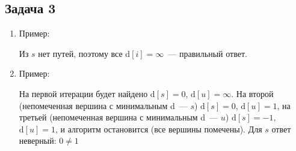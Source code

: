 \documentclass[a4paper]{article}
\begin{document}
\subsection*{Задача 3}
\begin{enumerate}
\item Пример:\newline{}\newline
Из $s$ нет путей, поэтому все $\mbox{d}[i]=\infty$~--- правильный ответ.
\item Пример:\newline
{}
На первой итерации будет найдено $\mbox{d}[s]=0$, $\mbox{d}[u]=\infty$. На второй (непомеченная вершина с минимальным d~--- $s$) $\mbox{d}[s]=0$, $\mbox{d}[u]=1$, на третьей (непомеченная вершина с минимальным d~--- $u$) $\mbox{d}[s]=-1$, $\mbox{d}[u]=1$, и алгоритм остановится (все вершины помечены). Для $s$ ответ неверный: $0\neq 1$
\end{enumerate}
\end{document}
